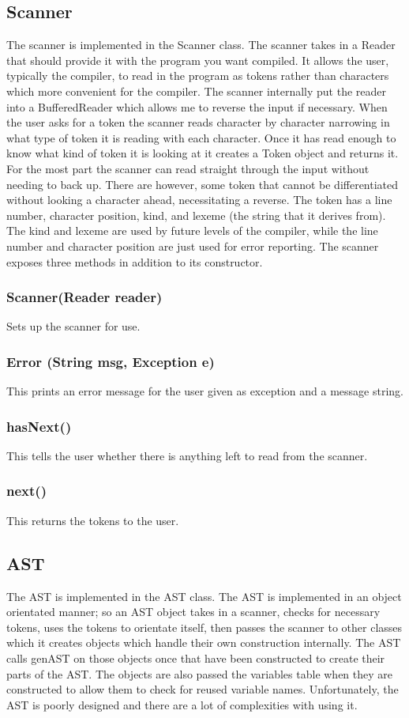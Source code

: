 \subsection*{Scanner}
The scanner is implemented in the Scanner class. The scanner takes in a Reader that should provide it with the program you want compiled. It allows the user, typically the compiler, to read in the program as tokens rather than characters which more convenient for the compiler. The scanner internally put the reader into a BufferedReader which allows me to reverse the input if necessary. When the user asks for a token the scanner reads character by character narrowing in what type of token it is reading with each character. Once it has read enough to know what kind of token it is looking at it creates a Token object and returns it. For the most part the scanner can read straight through the input without needing to back up. There are however, some token that cannot be differentiated without looking a character ahead, necessitating a reverse. The token has a line number, character position, kind, and lexeme (the string that it derives from). The kind and lexeme are used by future levels of the compiler, while the line number and character position are just used for error reporting. The scanner exposes three methods in addition to its constructor. 
\subsubsection*{Scanner(Reader reader)}
Sets up the scanner for use. 
\subsubsection*{Error (String msg, Exception e)}
This prints an error message for the user given as exception and a message string. 
\subsubsection*{hasNext()}
This tells the user whether there is anything left to read from the scanner. 
\subsubsection*{next()}
This returns the tokens to the user. 

\subsection*{AST}
The AST is implemented in the AST class. The AST is implemented in an object orientated manner; so an AST object takes in a scanner, checks for necessary tokens, uses the tokens to orientate itself, then passes the scanner to other classes which it creates objects which handle their own construction internally. The AST calls genAST on those objects once that have been constructed to create their parts of the AST. The objects are also passed the variables table when they are constructed to allow them to check for reused variable names. Unfortunately, the AST is poorly designed and there are a lot of complexities with using it. 

